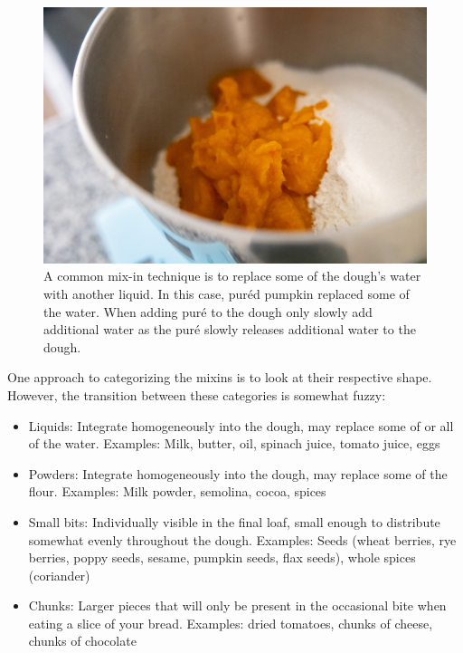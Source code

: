 \begin{figure}[htb!]
  \centering
  \includegraphics[width=\textwidth]{pumpkin-on-flour}
  \caption[Pumpkin puré]{A common mix-in technique is to replace some of
    the dough's water with another liquid. In this case, puréd pumpkin replaced
    some of the water. When adding puré to the dough only slowly add
    additional water as the puré slowly releases additional water to the
    dough.}%
\end{figure}

One approach to categorizing the mixins is to look at their respective shape.
However, the transition between these categories is somewhat fuzzy:

\begin{itemize}
  \item Liquids: Integrate homogeneously into the dough, may replace some of
      or all of the water. Examples: Milk, butter, oil, spinach juice, tomato
      juice, eggs
  \item Powders: Integrate homogeneously into the dough, may replace some of
      the flour. Examples: Milk powder, semolina, cocoa, spices
  \item Small bits: Individually visible in the final loaf, small enough to
      distribute somewhat evenly throughout the dough. Examples: Seeds (wheat
      berries, rye berries, poppy seeds, sesame, pumpkin seeds,
      flax seeds), whole spices (coriander)
  \item Chunks: Larger pieces that will only be present in the occasional bite
      when eating a slice of your bread. Examples: dried tomatoes, chunks of
      cheese, chunks of chocolate
\end{itemize}

